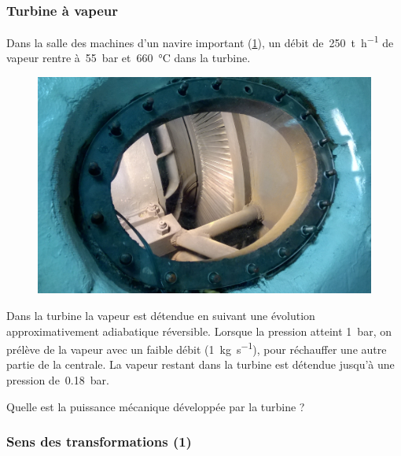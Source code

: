 \subsubsection{Turbine à vapeur}
\label{exo_turbine_vapeur_isentropique}

	Dans la salle des machines d’un navire important (\cref{fig_turbine_uss_hornet}), un débit de~\SI{250}{\tonne\per\hour} de vapeur rentre à~\SI{55}{\bar} et~\SI{660}{\degreeCelsius} dans la turbine.
	
	\begin{figure}[htp] %
		\begin{center}
		\includegraphics[width=\columnwidth]{images/turbine_uss_hornet.jpg}
		\end{center}
		\label{fig_turbine_uss_hornet}
	\end{figure}
	
	Dans la turbine la vapeur est détendue en suivant une évolution approximativement adiabatique réversible. Lorsque la pression atteint \SI{1}{\bar}, on prélève de la vapeur avec un faible débit (\SI{1}{\kilogram\per\second}), pour réchauffer une autre partie de la centrale. La vapeur restant dans la turbine est détendue jusqu’à une pression de~\SI{0,18}{\bar}.
	
	Quelle est la puissance mécanique développée par la turbine ?

\subsubsection{Sens des transformations (1)}
\label{exo_sens_transfos_un}

